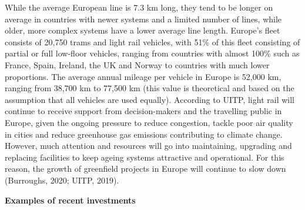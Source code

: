 \documentclass[
]{book}
\begin{document}
While the average European line is 7.3 km long, they tend to be longer on average in countries with newer systems and a limited number of lines, while older, more complex systems have a lower average line length. Europe's fleet consists of 20,750 trams and light rail vehicles, with 51\% of this fleet consisting of partial or full low-floor vehicles, ranging from countries with almost 100\% such as France, Spain, Ireland, the UK and Norway to countries with much lower proportions. The average annual mileage per vehicle in Europe is 52,000 km, ranging from 38,700 km to 77,500 km (this value is theoretical and based on the assumption that all vehicles are used equally). According to UITP, light rail will continue to receive support from decision-makers and the travelling public in Europe, given the ongoing pressure to reduce congestion, tackle poor air quality in cities and reduce greenhouse gas emissions contributing to climate change. However, much attention and resources will go into maintaining, upgrading and replacing facilities to keep ageing systems attractive and operational. For this reason, the growth of greenfield projects in Europe will continue to slow down (Burroughs, 2020; UITP, 2019).

\textbf{Examples of recent investments}
\end{document}
